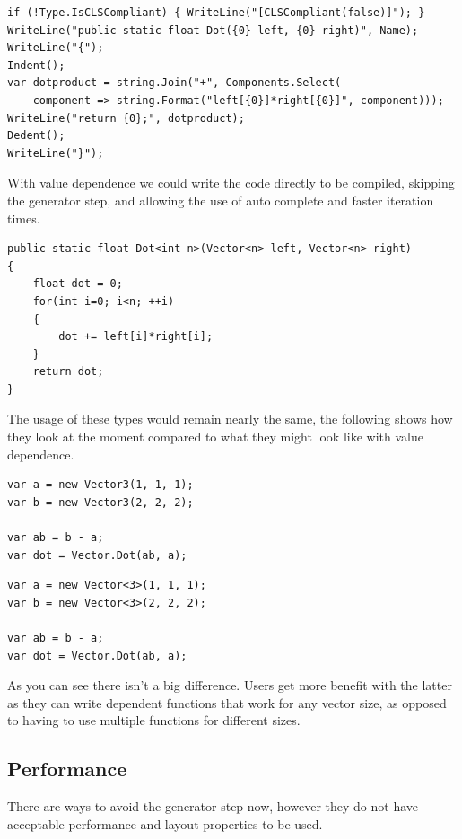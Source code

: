 \documentclass[english]{report}
\begin{document}
\begin{lstlisting}[keywordstyle={\color{blue}},language=sharpc,showstringspaces=false]
if (!Type.IsCLSCompliant) { WriteLine("[CLSCompliant(false)]"); }             
WriteLine("public static float Dot({0} left, {0} right)", Name);             
WriteLine("{");             
Indent();
var dotproduct = string.Join("+", Components.Select(
	component => string.Format("left[{0}]*right[{0}]", component)));
WriteLine("return {0};", dotproduct);
Dedent();
WriteLine("}");
\end{lstlisting}


With value dependence we could write the code directly to be compiled,
skipping the generator step, and allowing the use of auto complete
and faster iteration times.

\begin{lstlisting}[keywordstyle={\color{blue}},language=sharpc]
public static float Dot<int n>(Vector<n> left, Vector<n> right)
{
	float dot = 0;
	for(int i=0; i<n; ++i)
	{
		dot += left[i]*right[i];
	}
	return dot;
}
\end{lstlisting}
The usage of these types would remain nearly the same, the following
shows how they look at the moment compared to what they might look
like with value dependence.

\begin{lstlisting}[caption={Current method},keywordstyle={\color{blue}},language=sharpc]
var a = new Vector3(1, 1, 1);
var b = new Vector3(2, 2, 2);

var ab = b - a;
var dot = Vector.Dot(ab, a);
\end{lstlisting}


\begin{lstlisting}[caption={Proposal},keywordstyle={\color{blue}},language=sharpc]
var a = new Vector<3>(1, 1, 1);
var b = new Vector<3>(2, 2, 2);

var ab = b - a;
var dot = Vector.Dot(ab, a);
\end{lstlisting}


As you can see there isn't a big difference. Users get more benefit
with the latter as they can write dependent functions that work for
any vector size, as opposed to having to use multiple functions for
different sizes.


\subsection{Performance\label{sub:Performance}}

There are ways to avoid the generator step now, however they do not
have acceptable performance and layout properties to be used. 
\end{document}
